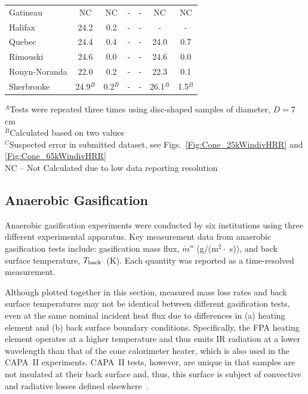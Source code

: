 \documentclass{book}
\begin{document}
\begin{table}[ht]
\begin{center}
\begin{tabular}{|l|cc|cc|cc|}
Gatineau                                & NC       & NC                     & -                     & -                      & NC                    & NC                        \\
Halifax                                 & 24.2     & 0.2                    & -                     & -                      & -                     & -                         \\
Quebec                                  & 24.4     & 0.4                    & -                     & -                      & 24.0                  & 0.7                       \\
Rimouski                                & 24.6     & 0.0                    & -                     & -                      & 24.6                  & 0.0                       \\
Rouyn-Noranda                           & 22.0     & 0.2                    & -                     & -                      & 22.3                  & 0.1                       \\
Sherbrooke                              & 24.9$^B$ & 0.2$^B$                & -                     & -                      & 26.1$^B$              & 1.5$^B$                   \\ \hline
\end{tabular}
\end{center}
$^A$Tests were repeated three times using disc-shaped samples of diameter, $D = 7$ cm \\
$^B$Calculated based on two values \\
$^C$Suspected error in submitted dataset, see Figs.~\ref{Fig:Cone_25kWindivHRR} and \ref{Fig:Cone_65kWindivHRR} \\
NC – Not Calculated due to low data reporting resolution
\end{table}


\newpage
\subsection{Anaerobic Gasification}

Anaerobic gasification experiments were conducted by six institutions using three different experimental apparatus. Key measurement data from anaerobic gasification tests include: gasification mass flux, $\dot{m}''$ (g/(m$^2 \cdot$ s)), and back surface temperature, $T_{\rm back}$~(K). Each quantity was reported as a time-resolved measurement.

Although plotted together in this section, measured mass loss rates and back surface temperatures may not be identical between different gasification tests, even at the same nominal incident heat flux due to differences in (a) heating element and (b) back surface boundary conditions. Specifically, the FPA heating element operates at a higher temperature and thus emits IR radiation at a lower wavelength than that of the cone calorimeter heater, which is also used in the CAPA~II experiments. CAPA~II tests, however, are unique in that samples are not insulated at their back surface and, thus, this surface is subject of convective and radiative losses defined elsewhere~\cite{swann2017controlled}.
\end{document}
